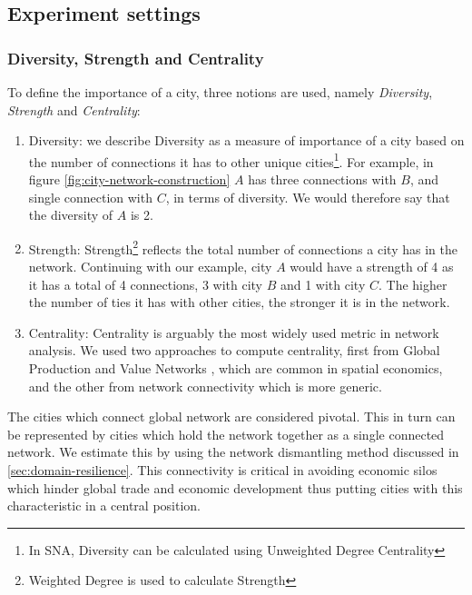 		\subsection{Experiment settings}
			
			\subsubsection{Diversity, Strength and Centrality}
			To define the importance of a city, three notions are used, namely \textit{Diversity}, \textit{Strength} and \textit{Centrality}:
			
			\begin{enumerate}
				\item Diversity: we describe Diversity as a measure of importance of a city based on the number of connections it has to other unique cities\footnote{In SNA, Diversity can be calculated using Unweighted Degree Centrality}. For example, in figure \ref{fig:city-network-construction} $A$ has three connections with $B$, and single connection with $C$, in terms of diversity. We would therefore say that the diversity of $A$ is 2.
				
				\item Strength: Strength\footnote{Weighted Degree is used to calculate Strength} reflects the total number of connections a city has in the network. Continuing with our example, city $A$ would have a strength of 4 as it has a total of 4 connections, 3 with city $B$ and 1 with city $C$. The higher the number of ties it has with other cities, the stronger it is in the network.
				
				\item Centrality: Centrality is arguably the most widely used metric in network analysis. We used two approaches to compute centrality, first from Global Production and Value Networks \cite{henderson2002,gereffi2005}, which are common in spatial economics, and the other from network connectivity \cite{brandes2005} which is more generic.
			\end{enumerate}
		
			The cities which connect global network are considered pivotal. This in turn can be represented by cities which hold the network together as a single connected network. We estimate this by using the network dismantling method discussed in \ref{sec:domain-resilience}. This connectivity is critical in avoiding economic silos which hinder global trade and economic development thus putting cities with this characteristic in a central position.
		
